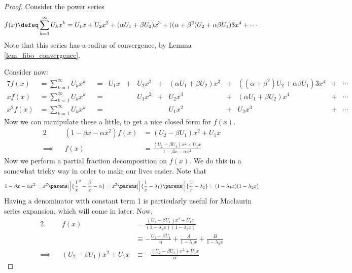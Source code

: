 \begin{proof}
 Consider the power series
 \begin{equation*}
  f(x) \defeq \sum_{k=1}^\infty U_k x^k
            = U_1 x + U_2 x^2 + (\alpha U_1 + \beta U_2) x^3
            + ((\alpha + \beta^2)U_2 + \alpha \beta U_1)3x^4 + \dotsb
 \end{equation*}
 Note that this series has a radius of convergence, by Lemma
 \ref{lem_fibo_convergence}.

 Consider now:
 \begin{alignat*}7
  f(x) &= \sum_{k = 1}^\infty U_k x^k
   &&={}& U_1 x &+{}& U_2 x^2 &+{}& (\alpha U_1 + \beta U_2) x^3
       &+{}& ((\alpha + \beta^2)U_2 + \alpha \beta U_1)3x^4
       &+{}& \dotsb \\
  x f(x) &= \sum_{k = 1}^\infty U_k x^k
   &&={}& && U_1 x^2 &+{}& U_2 x^3 &+{}& (\alpha U_1 + \beta U_2) x^4
       &+{}& \dotsb \\
  x^2 f(x) &= \sum_{k = 1}^\infty U_k x^k
   &&={}& &&&& U_1 x^2 &+{}& U_2 x^3 &+{}& \dotsb
 \end{alignat*}
 Now we can manipulate these a little, to get a nice closed form for \(f(x)\).
 \begin{alignat*}2
  && (1 - \beta x - \alpha x^2) f(x) &= (U_2 - \beta U_1)x^2 + U_1 x \\
  \implies{}&& f(x) &= \frac{(U_2 - \beta U_1)x^2 + U_1 x}
                            {1 - \beta x - \alpha x^2}
 \end{alignat*}
 Now we perform a partial fraction decomposition on \(f(x)\). We do this in a
 somewhat tricky way in order to make our lives easier. Note that
 \begin{equation*}
  1 - \beta x - \alpha x^2 = x^2 \parens[\Big]
        {\frac 1x^2 - \frac \beta x - \alpha}
      = x^2\parens[\Big]{\frac 1x - \lambda_1}
           \parens[\Big]{\frac 1x - \lambda_2}
      = (1 - \lambda_1 x)(1 - \lambda_2 x)
 \end{equation*}
 Having a denominator with constant term 1 is particularly useful for Maclaurin
 series expansion, which will come in later. Now,
 \begin{alignat*}2
  && f(x) &= \frac{(U_2 - \beta U_1)x^2 + U_1 x}
                 {(1 - \lambda_1 x)(1 - \lambda_2 x)} \\
  && &\equiv - \frac{U_2 - \beta U_1}\alpha +
                \frac A{1 - \lambda_1 x} + \frac B{1 - \lambda_2 x} \\
  \implies{}&& (U_2 - \beta U_1)x^2 + U_1 x &\equiv
               -\frac{(U_2 - \beta U_1)x^2 + U_1 x}\alpha

\end{alignat*}
\end{proof}
